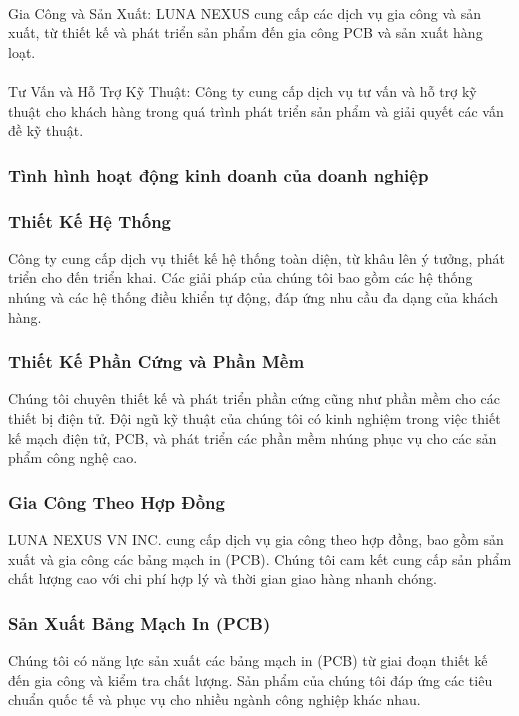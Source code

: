 \begin{flushleft}
		\paragraph{}
		\fontsize{14}{20}\selectfont Gia Công và Sản Xuất: LUNA NEXUS cung cấp các dịch vụ gia công và sản xuất, từ thiết kế và phát triển sản phẩm đến gia công PCB và sản xuất hàng loạt.\\
		\paragraph{}
		\fontsize{14}{20}\selectfont Tư Vấn và Hỗ Trợ Kỹ Thuật: Công ty cung cấp dịch vụ tư vấn và hỗ trợ kỹ thuật cho khách hàng trong quá trình phát triển sản phẩm và giải quyết các vấn đề kỹ thuật.\\
		\subsubsection{Tình hình hoạt động kinh doanh của doanh nghiệp}
		\subsubsection*{ Thiết Kế Hệ Thống}
		\fontsize{14}{20}\selectfont Công ty cung cấp dịch vụ thiết kế hệ thống toàn diện, từ khâu lên ý tưởng, phát triển cho đến triển khai. Các giải pháp của chúng tôi bao gồm các hệ thống nhúng và các hệ thống điều khiển tự động, đáp ứng nhu cầu đa dạng của khách hàng.

		\subsubsection*{ Thiết Kế Phần Cứng và Phần Mềm}
		\fontsize{14}{20}\selectfont Chúng tôi chuyên thiết kế và phát triển phần cứng cũng như phần mềm cho các thiết bị điện tử. Đội ngũ kỹ thuật của chúng tôi có kinh nghiệm trong việc thiết kế mạch điện tử, PCB, và phát triển các phần mềm nhúng phục vụ cho các sản phẩm công nghệ cao.

		\subsubsection*{ Gia Công Theo Hợp Đồng}
		\fontsize{14}{20}\selectfont LUNA NEXUS VN INC. cung cấp dịch vụ gia công theo hợp đồng, bao gồm sản xuất và gia công các bảng mạch in (PCB). Chúng tôi cam kết cung cấp sản phẩm chất lượng cao với chi phí hợp lý và thời gian giao hàng nhanh chóng.

		\subsubsection*{ Sản Xuất Bảng Mạch In (PCB)}
		\fontsize{14}{20}\selectfont Chúng tôi có năng lực sản xuất các bảng mạch in (PCB) từ giai đoạn thiết kế đến gia công và kiểm tra chất lượng. Sản phẩm của chúng tôi đáp ứng các tiêu chuẩn quốc tế và phục vụ cho nhiều ngành công nghiệp khác nhau.


\end{flushleft}
